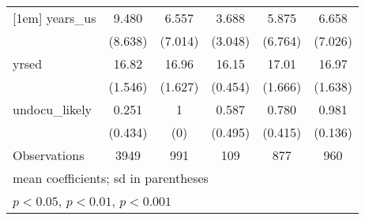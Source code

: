 \begin{table}[htbp]
\begin{tabular}{l*{5}{c}}
[1em]
years\_us            &       9.480         &       6.557         &       3.688         &       5.875         &       6.658         \\
                    &     (8.638)         &     (7.014)         &     (3.048)         &     (6.764)         &     (7.026)         \\
[1em]
yrsed               &       16.82         &       16.96         &       16.15         &       17.01         &       16.97         \\
                    &     (1.546)         &     (1.627)         &     (0.454)         &     (1.666)         &     (1.638)         \\
[1em]
undocu\_likely       &       0.251         &           1         &       0.587         &       0.780         &       0.981         \\
                    &     (0.434)         &         (0)         &     (0.495)         &     (0.415)         &     (0.136)         \\
\hline
Observations        &        3949         &         991         &         109         &         877         &         960         \\
\hline\hline
\multicolumn{6}{l}{\footnotesize mean coefficients; sd in parentheses}\\
\multicolumn{6}{l}{\footnotesize \sym{*} \(p<0.05\), \sym{**} \(p<0.01\), \sym{***} \(p<0.001\)}\\
\end{tabular}
\end{table}
